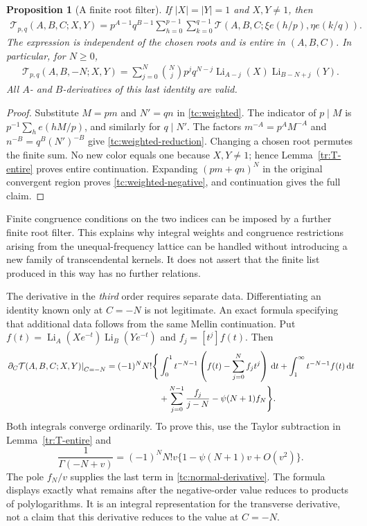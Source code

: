 \documentclass[11pt,a4paper]{article}
\numberwithin{equation}{section}
\newtheorem{proposition}[theorem]{Proposition}
\theoremstyle{definition}
\theoremstyle{remark}
\DeclareMathOperator{\Li}{Li}
\newcommand{\dd}{\,\mathrm d}
\begin{document}
\begin{proposition}[A finite root filter]\label{tc:root-filter}
If $|X|=|Y|=1$ and $X,Y\ne1$, then
\begin{align}\label{tc:weighted-reduction}
 \mathcal T_{p,q}(A,B,C;X,Y)
 =p^{A-1}q^{B-1}
   \sum_{h=0}^{p-1}\sum_{k=0}^{q-1}
     \mathcal T(A,B,C;\xi e(h/p),\eta e(k/q)).
\end{align}
The expression is independent of the chosen roots and is entire in
$(A,B,C)$. In particular, for $N\geq0$,
\begin{align}\label{tc:weighted-negative}
 \mathcal T_{p,q}(A,B,-N;X,Y)
 =\sum_{j=0}^N\binom Nj p^jq^{N-j}
             \Li_{A-j}(X)\Li_{B-N+j}(Y).
\end{align}
All $A$- and $B$-derivatives of this last identity are valid.
\end{proposition}
\begin{proof}
Substitute $M=pm$ and $N'=qn$ in \eqref{tc:weighted}. The indicator
of $p\mid M$ is $p^{-1}\sum_he(hM/p)$, and similarly for $q\mid N'$.
The factors $m^{-A}=p^AM^{-A}$ and $n^{-B}=q^B(N')^{-B}$ give
\eqref{tc:weighted-reduction}. Changing a chosen root permutes the
finite sum. No new color equals one because $X,Y\ne1$; hence
Lemma~\ref{tr:T-entire} proves entire continuation. Expanding
$(pm+qn)^N$ in the original convergent region proves
\eqref{tc:weighted-negative}, and continuation gives the full claim.
\end{proof}

Finite congruence conditions on the two indices can be imposed by a
further finite root filter. This explains why integral weights and
congruence restrictions arising from the unequal-frequency lattice can
be handled without introducing a new family of transcendental kernels.
It does not assert that the finite list produced in this way has no
further relations.

The derivative in the \emph{third} order requires separate data.
Differentiating an identity known only at $C=-N$ is not legitimate.
An exact formula specifying that additional data follows from the
same Mellin continuation. Put
$f(t)=\Li_A(Xe^{-t})\Li_B(Ye^{-t})$ and $f_j=[t^j]f(t)$. Then
\begin{align}\label{tc:normal-derivative}
 \left.\partial_C\mathcal T(A,B,C;X,Y)\right|_{C=-N}
 =(-1)^NN!\Bigg\{&
  \int_0^1t^{-N-1}\left(f(t)-\sum_{j=0}^Nf_jt^j\right)\dd t
  +\int_1^\infty t^{-N-1}f(t)\dd t\notag\\
 &+\sum_{j=0}^{N-1}\frac{f_j}{j-N}
        -\psi(N+1)f_N\Bigg\}.
\end{align}
Both integrals converge ordinarily. To prove this, use the Taylor
subtraction in Lemma~\ref{tr:T-entire} and
\[
 \frac1{\Gamma(-N+v)}
   =(-1)^NN!v\{1-\psi(N+1)v+O(v^2)\}.
\]
The pole $f_N/v$ supplies the last term in
\eqref{tc:normal-derivative}. The formula displays exactly what remains
after the negative-order value reduces to products of polylogarithms.
It is an integral representation for the transverse derivative, not a
claim that this derivative reduces to the value at $C=-N$.
\end{document}
